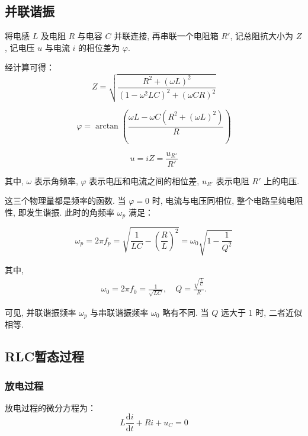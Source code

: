 \documentclass[zihao=5, UTF8]{article}
\theoremstyle{MyLineTheoremStyle} %
\theoremstyle{MyBlockTheoremStyle} %
\theoremstyle{MySubsubsectionStyle} %
\begin{document}
\subsection{并联谐振}
将电感 $ L $ 及电阻 $R$ 与电容 $ C $ 并联连接, 再串联一个电阻箱 $ R' $, 记总阻抗大小为 $ Z $, 记电压 $ u $ 与电流 $ i $ 的相位差为 $ \varphi $. 

经计算可得：
\begin{equation}
Z = \sqrt{\frac{R^2 + (\omega L)^2}{(1 - \omega^2 LC)^2 + (\omega CR)^2}}
\end{equation}

\begin{equation}
\varphi = \arctan \left( \frac{\omega L - \omega C (R^2 + (\omega L)^2)}{R} \right)
\end{equation}

\begin{equation}
u = i Z = \frac{u_{R'}}{R'}
\end{equation}

其中, $ \omega $ 表示角频率, $ \varphi $ 表示电压和电流之间的相位差, $ u_{R'} $ 表示电阻 $ R' $ 上的电压. 

这三个物理量都是频率的函数. 当 $\varphi = 0$ 时, 电流与电压同相位, 整个电路呈纯电阻性, 即发生谐振. 此时的角频率 $\omega_p$ 满足：

\begin{equation}
\omega_p = 2\pi f_p = \sqrt{\frac{1}{LC} - \left(\frac{R}{L}\right)^2} = \omega_0 \sqrt{1 - \frac{1}{Q^2}}
\end{equation}

其中, 
\begin{gather}
\omega_0 = 2\pi f_0 = \frac{1}{\sqrt{LC}}, \quad Q = \frac{\sqrt{\frac{L}{C}}}{R}.
\end{gather}

可见, 并联谐振频率 $\omega_p$ 与串联谐振频率 $\omega_0$ 略有不同. 当 $Q$ 远大于 1 时, 二者近似相等. 

\subsection{RLC暂态过程}
\subsubsection{放电过程}

放电过程的微分方程为：
\begin{equation}
L \frac{\mathrm{d}i}{\mathrm{d}t} + Ri + u_C = 0
\end{equation}
\end{document}
